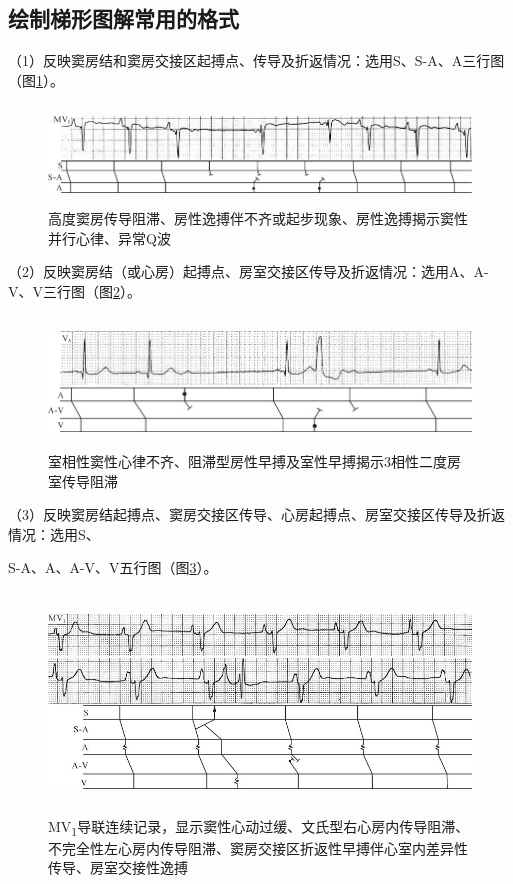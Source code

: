 \protect\hypertarget{text00017.htmlux5cux23subid123}{}{}

\subsection{绘制梯形图解常用的格式}

（1）反映窦房结和窦房交接区起搏点、传导及折返情况：选用S、S-A、A三行图（图\ref{fig10-1}）。

\begin{figure}[!htbp]
 \centering
 \includegraphics[width=5.76042in,height=1.04167in]{./images/Image00145.jpg}
 \captionsetup{justification=centering}
 \caption{高度窦房传导阻滞、房性逸搏伴不齐或起步现象、房性逸搏揭示窦性并行心律、异常Q波}
 \label{fig10-1}
  \end{figure} 

（2）反映窦房结（或心房）起搏点、房室交接区传导及折返情况：选用A、A-V、V三行图（图\ref{fig10-2}）。

\begin{figure}[!htbp]
 \centering
 \includegraphics[width=5.75in,height=1.375in]{./images/Image00146.jpg}
 \captionsetup{justification=centering}
 \caption{室相性窦性心律不齐、阻滞型房性早搏及室性早搏揭示3相性二度房室传导阻滞}
 \label{fig10-2}
  \end{figure} 

（3）反映窦房结起搏点、窦房交接区传导、心房起搏点、房室交接区传导及折返情况：选用S、

S-A、A、A-V、V五行图（图\ref{fig10-3}）。

\begin{figure}[!htbp]
 \centering
 \includegraphics[width=5.5625in,height=2.29167in]{./images/Image00147.jpg}
 \captionsetup{justification=centering}
 \caption{MV\textsubscript{1}导联连续记录，显示窦性心动过缓、文氏型右心房内传导阻滞、不完全性左心房内传导阻滞、窦房交接区折返性早搏伴心室内差异性传导、房室交接性逸搏}
 \label{fig10-3}
  \end{figure} 


